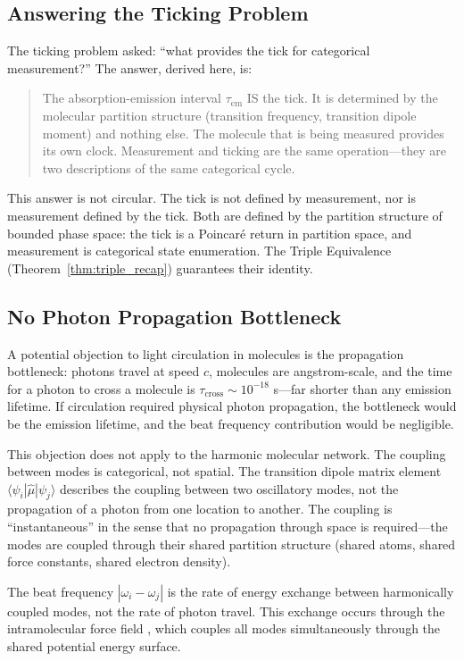 \documentclass[11pt,a4paper]{article}
\theoremstyle{definition}
\theoremstyle{remark}
\newcommand{\tem}{\tau_{\mathrm{em}}}
\begin{document}
\subsection{Answering the Ticking Problem}

The ticking problem asked: ``what provides the tick for categorical measurement?'' The answer, derived here, is:

\begin{quote}
The absorption-emission interval $\tem$ IS the tick. It is determined by the molecular partition structure (transition frequency, transition dipole moment) and nothing else. The molecule that is being measured provides its own clock. Measurement and ticking are the same operation---they are two descriptions of the same categorical cycle.
\end{quote}

This answer is not circular. The tick is not defined by measurement, nor is measurement defined by the tick. Both are defined by the partition structure of bounded phase space: the tick is a Poincar\'{e} return in partition space, and measurement is categorical state enumeration. The Triple Equivalence (Theorem~\ref{thm:triple_recap}) guarantees their identity.

\subsection{No Photon Propagation Bottleneck}

A potential objection to light circulation in molecules is the propagation bottleneck: photons travel at speed $c$, molecules are angstrom-scale, and the time for a photon to cross a molecule is $\tau_{\mathrm{cross}} \sim 10^{-18}$ s---far shorter than any emission lifetime. If circulation required physical photon propagation, the bottleneck would be the emission lifetime, and the beat frequency contribution would be negligible.

This objection does not apply to the harmonic molecular network. The coupling between modes is categorical, not spatial. The transition dipole matrix element $\langle \psi_i | \hat{\mu} | \psi_j \rangle$ describes the coupling between two oscillatory modes, not the propagation of a photon from one location to another. The coupling is ``instantaneous'' in the sense that no propagation through space is required---the modes are coupled through their shared partition structure (shared atoms, shared force constants, shared electron density).

The beat frequency $|\omega_i - \omega_j|$ is the rate of energy exchange between harmonically coupled modes, not the rate of photon travel. This exchange occurs through the intramolecular force field \citep{wilson1955}, which couples all modes simultaneously through the shared potential energy surface.
\end{document}
